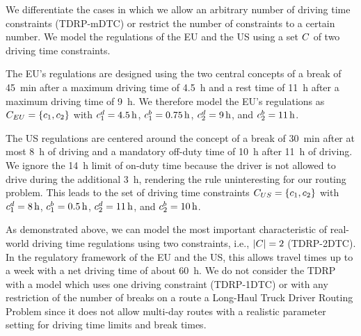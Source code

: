We differentiate the cases in which we allow an arbitrary number of driving time constraints (TDRP-mDTC) or restrict the number of constraints to a certain number. We model the regulations of the EU and the US using a set $C$ of two driving time constraints.

The EU's regulations are designed using the two central concepts of a break of \SI{45}{\minute} after a maximum driving time of \SI{4.5}{\hour} and a rest time of \SI{11}{\hour} after a maximum driving time of \SI{9}{\hour}. We therefore model the EU's regulations as $C_{EU} = \{c_1, c_2\}$ with $c_1^d = \SI{4.5}{\hour}$, $c_1^b = \SI{0.75}{\hour}$, $c_2^d = \SI{9}{\hour}$, and $ c_2^b = \SI{11}{\hour}$.

The US regulations are centered around the concept of a break of \SI{30}{\minute} after at most \SI{8}{\hour} of driving and a mandatory off-duty time of \SI{10}{\hour} after \SI{11}{\hour} of driving. We ignore the \SI{14}{\hour} limit of on-duty time because the driver is not allowed to drive during the additional \SI{3}{\hour}, rendering the rule uninteresting for our routing problem. This leads to the set of driving time constraints $C_{US} = \{c_1, c_2\}$ with $c_1^d = \SI{8}{\hour}$, $c_1^b = \SI{0.5}{\hour}$, $c_2^d = \SI{11}{\hour}$, and $c_2^b = \SI{10}{\hour}$.

As demonstrated above, we can model the most important characteristic of real-world driving time regulations using two constraints, i.e., $|C| = 2$ (TDRP-2DTC). In the regulatory framework of the EU and the US, this allows travel times up to a week with a net driving time of about \SI{60}{\hour}. We do not consider the TDRP with a model which uses one driving constraint (TDRP-1DTC) or with any restriction of the number of breaks on a route a Long-Haul Truck Driver Routing Problem since it does not allow multi-day routes with a realistic parameter setting for driving time limits and break times.
